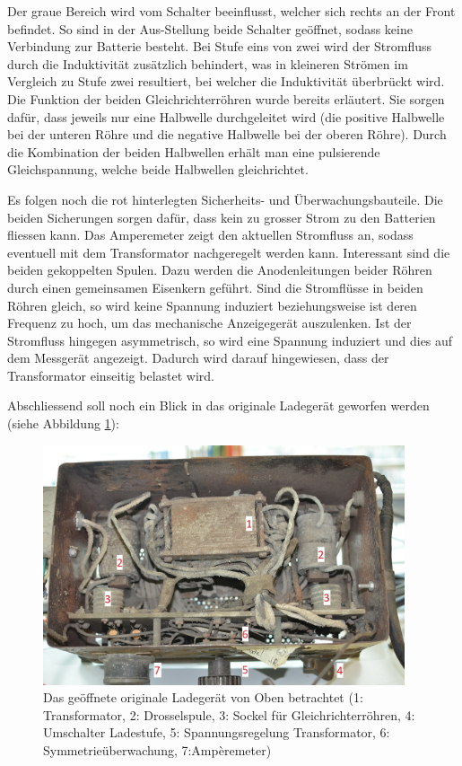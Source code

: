 \newpage

Der graue Bereich wird vom Schalter beeinflusst, welcher sich rechts an der Front befindet. So sind in der Aus-Stellung beide Schalter geöffnet, sodass keine Verbindung zur Batterie besteht. Bei Stufe eins von zwei wird der Stromfluss durch die Induktivität zusätzlich behindert, was in kleineren Strömen im Vergleich zu Stufe zwei resultiert, bei welcher die Induktivität überbrückt wird. Die Funktion der beiden Gleichrichterröhren wurde bereits erläutert. Sie sorgen dafür, dass jeweils nur eine Halbwelle durchgeleitet wird (die positive Halbwelle bei der unteren Röhre und die negative Halbwelle bei der oberen Röhre). Durch die Kombination der beiden Halbwellen erhält man eine pulsierende Gleichspannung, welche beide Halbwellen gleichrichtet.

Es folgen noch die rot hinterlegten Sicherheits- und Überwachungsbauteile. Die beiden Sicherungen sorgen dafür, dass kein zu grosser Strom zu den Batterien fliessen kann. Das Amperemeter zeigt den aktuellen Stromfluss an, sodass eventuell mit dem Transformator nachgeregelt werden kann. Interessant sind die beiden gekoppelten Spulen. Dazu werden die Anodenleitungen beider Röhren durch einen gemeinsamen Eisenkern geführt. Sind die Stromflüsse in beiden Röhren gleich, so wird keine Spannung induziert beziehungsweise ist deren Frequenz zu hoch, um das mechanische Anzeigegerät auszulenken. Ist der Stromfluss hingegen asymmetrisch, so wird eine Spannung induziert und dies auf dem Messgerät angezeigt. Dadurch wird darauf hingewiesen, dass der Transformator einseitig belastet wird.

Abschliessend soll noch ein Blick in das originale Ladegerät geworfen werden (siehe Abbildung \ref{fig:Ladegeraet_Original}):

\begin{figure}[h]
	\centering
		\includegraphics[width=0.95\textwidth]{images/Ladegeraet_Original.JPG}
	\caption{Das geöffnete originale Ladegerät von Oben betrachtet (1: Transformator, 2: Drosselspule, 3: Sockel für Gleichrichterröhren, 4: Umschalter Ladestufe, 5: Spannungsregelung Transformator, 6: Symmetrieüberwachung, 7:Ampèremeter)}
	\label{fig:Ladegeraet_Original}
\end{figure}

\newpage